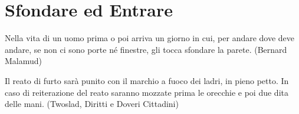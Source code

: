 \section{Sfondare ed Entrare}\hypertarget{sfondare}{}\label{sfondarecap}

\begin{enfasi}{
Nella vita di un uomo prima o poi arriva un giorno in cui, per andare dove deve andare, se non ci sono porte né finestre, gli tocca sfondare la parete. (Bernard Malamud)

\medskip

Il reato di furto sarà punito con il marchio a fuoco dei ladri, in pieno petto. In caso di reiterazione del reato saranno mozzate prima le orecchie e poi due dita delle mani. (Twoslad, Diritti e Doveri Cittadini)

}\end{enfasi}

